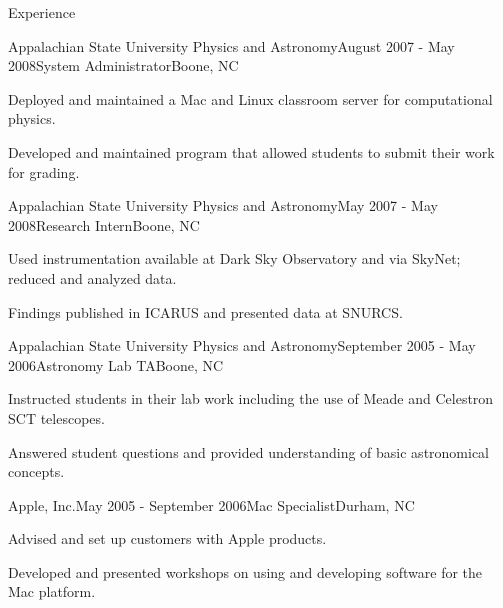 \documentclass{cv} %
\begin{document}
\begin{rSection}{Experience}
\begin{rSubsection}{Appalachian State University Physics and Astronomy}{August 2007 - May 2008}{System Administrator}{Boone, NC}
\item Deployed and maintained a Mac and Linux classroom server for computational physics.
\item Developed and maintained program that allowed students to submit their work for grading.
\end{rSubsection}

\begin{rSubsection}{Appalachian State University Physics and Astronomy}{May 2007 - May 2008}{Research Intern}{Boone, NC}
\item Used instrumentation available at Dark Sky Observatory and via SkyNet; reduced and analyzed data.
\item Findings published in ICARUS and presented data at SNURCS.
\end{rSubsection}

\begin{rSubsection}{Appalachian State University Physics and Astronomy}{September 2005 - May 2006}{Astronomy Lab TA}{Boone, NC}
\item Instructed students in their lab work including the use of Meade and Celestron SCT telescopes.
\item Answered student questions and provided understanding of basic astronomical concepts.
\end{rSubsection}

\begin{rSubsection}{Apple, Inc.}{May 2005 - September 2006}{Mac Specialist}{Durham, NC}
\item Advised and set up customers with Apple products.
\item Developed and presented workshops on using and developing software for the Mac platform.
\end{rSubsection}

\end{rSection}

\end{document}
